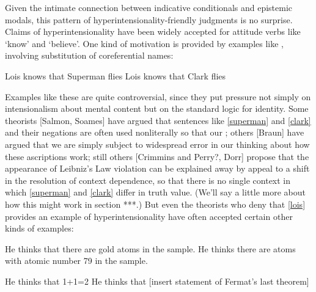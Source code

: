 \documentclass[If.tex]{subfiles}
\begin{document}
Given the intimate connection between indicative conditionals and epistemic modals, this pattern of hyperintensionality-friendly judgments is no surprise.  Claims of hyperintensionality have been widely accepted for attitude verbs like ‘know’ and ‘believe’.  One kind of motivation is provided by examples like , involving substitution of coreferential names:
\begin{prop}
	\nitem \label{lois}
	\begin{prop}
		\aitem \label{superman}
		Lois knows that Superman flies
		\aitem \label{clark}
		Lois knows that Clark flies
	\end{prop}
\end{prop}
Examples like these are quite controversial, since they put pressure not simply on intensionalism about mental content but on the standard logic for identity.  Some theorists [Salmon, Soames] have argued that sentences like \ref{superman} and \ref{clark} and their negations are often used nonliterally so that our ; others [Braun] have argued that we are simply subject to widespread error in our thinking about how these ascriptions work; still others [Crimmins and Perry?, Dorr] propose that the appearance of Leibniz's Law violation can be explained away by appeal to a shift in the resolution of context dependence, so that there is no single context in which \ref{superman} and \ref{clark} differ in truth value.  (We'll say a little more about how this might work in section ***.)  But even the theorists who deny that \ref{lois} provides an example of hyperintensionality have often accepted certain other kinds of examples:
\begin{prop}
	\nitem
	\begin{prop}
		\aitem
		He thinks that there are gold atoms in the sample.
		\aitem
		He thinks there are atoms with atomic number 79 in the sample.
	\end{prop}
	\nitem
	\begin{prop}
		\aitem
		He thinks that 1+1=2
		\aitem
		He thinks that [insert statement of Fermat's last theorem]
	\end{prop}
\end{prop}
\end{document}
